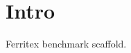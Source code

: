 \documentclass{article}
\begin{document}
\section{Intro}
Ferritex benchmark scaffold.
\end{document}
